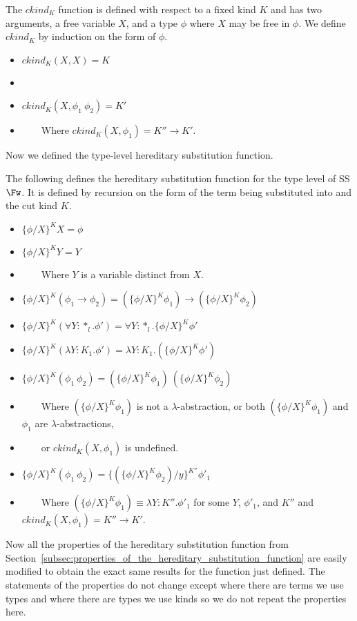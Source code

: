 \begin{definition}
  \label{def:ctype_stlc}
  The $ckind_K$ function is defined with respect to a fixed kind $K$
  and has two arguments, a free variable $X$, and a type $\phi$ where $X$
  may be free in $\phi$.  We define $ckind_K$ by induction on the form of $\phi$.
\begin{itemize}
\item[] $ckind_K(X,X) = K$
  \item[]
  \item[] $ckind_K(X,\phi_1\ \phi_2) = K'$
  \item[] \ \ \ \ Where $ckind_K(X,\phi_1) = K'' \to K'$.
  \end{itemize}
\end{definition}
\noindent
Now we defined the type-level hereditary substitution function.
\begin{definition}
  \label{def:hereditary_substitution_function__type_level_ssfw}
  The following defines the hereditary substitution function for the type level of SS$\Fw$.  It
  is defined by recursion on the form of the term being substituted
  into and the cut kind $K$.
  \begin{itemize}
  \item[] $\{\phi/X\}^K X = \phi$
  \item[] $\{\phi/X\}^K Y = Y$
  \item[] \ \ \ \ Where $Y$ is a variable distinct from $X$.
  \item[] $\{\phi/X\}^K (\phi_1 \to \phi_2) = (\{\phi/X\}^K \phi_1) \to (\{\phi/X\}^K \phi_2)$
  \item[] $\{\phi/X\}^K (\forall Y:*_l.\phi') = \forall Y:*_l.\{\phi/X\}^K \phi'$
  \item[] $\{\phi/X\}^K (\lambda Y:K_1.\phi') = \lambda Y:K_1.(\{\phi / X\}^K \phi')$
  \item[] $\{\phi/X\}^K (\phi_1\ \phi_2) = (\{\phi/X\}^K \phi_1)\ (\{\phi/X\}^K \phi_2)$
  \item[] \ \ \ \ Where $(\{\phi/X\}^K \phi_1)$ is not a $\lambda$-abstraction, or both $(\{\phi/X\}^K \phi_1)$
    and $\phi_1$ are $\lambda$-abstractions,
  \item[] \ \ \ \ or $ckind_K(X,\phi_1)$ is undefined.
  \item[] $\{\phi/X\}^{K} (\phi_1\ \phi_2) = \{(\{\phi/X\}^{K} \phi_2)/y\}^{K''} \phi'_1$
  \item[] \ \ \ \ Where $(\{\phi/X\}^{K} \phi_1) \equiv \lambda Y:K''.\phi'_1$ 
    for some $Y$, $\phi'_1$, and $K''$ and $ckind_K(X,\phi_1) = K'' \to K'$.
  \end{itemize}
\end{definition}
Now all the properties of the hereditary substitution function from
Section~\ref{subsec:properties_of_the_hereditary_substitution_function}
are easily modified to obtain the exact same results for the function
just defined.  The statements of the properties do not change except
where there are terms we use types and where there are types we use
kinds so we do not repeat the properties here.  

